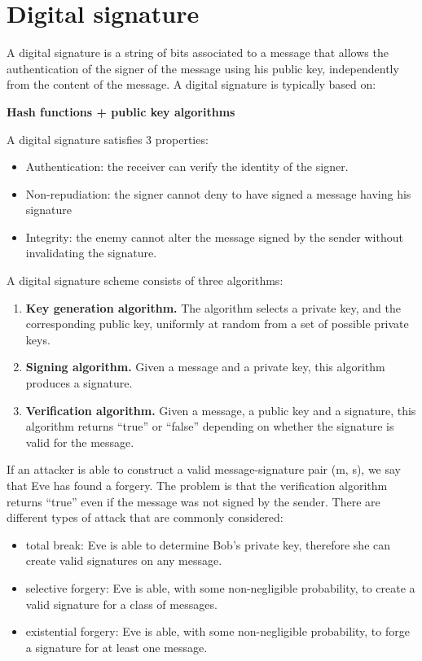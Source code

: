 \documentclass[a4paper, 10pt, titlepage]{article}
\begin{document}
\section{Digital signature}
A digital signature is a string of bits associated to a message that allows the authentication of the signer of the message using his public key, independently from the content of the message.
A digital signature is typically based on:
\begin{center}
\textbf{Hash functions + public key algorithms}
\end{center}
A digital signature satisfies 3 properties:
\begin{itemize}
\item Authentication: the receiver can verify the identity of the signer.
\item Non-repudiation: the signer cannot deny to have signed a message having his signature
\item Integrity: the enemy cannot alter the message signed by the sender without invalidating the signature.
\end{itemize}
A digital signature scheme consists of three algorithms:
\begin{enumerate}
\item \textbf{Key generation algorithm.} 
The algorithm selects a private key, and the corresponding public key, uniformly at random from a set of possible private keys.
\item \textbf{Signing algorithm.}
Given a message and a private key, this algorithm produces a
signature. 
\item \textbf{Verification algorithm.}
Given a message, a public key and a signature, this algorithm returns “true” or “false” depending on whether the signature is valid for the message.
\end{enumerate}
If an attacker is able to construct a valid message-signature pair (m, s), we say that Eve has found a forgery. The problem is that the verification algorithm returns “true” even if the message was not signed by the sender.
There are different types of attack that are commonly considered:
\begin{itemize}
\item total break: Eve is able to determine Bob’s private key, therefore she can create valid signatures on any message.
\item selective forgery: Eve is able, with some non-negligible probability, to create a valid signature for a class of messages.
\item existential forgery: Eve is able, with some non-negligible probability, to forge a signature for at least one message.
\end{itemize}
\end{document}
